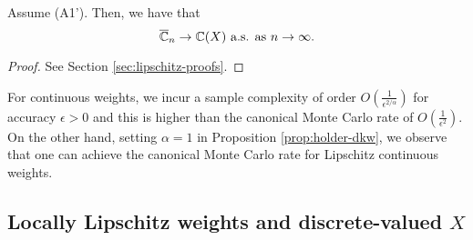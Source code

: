 \begin{proposition}
\label{prop:lipschitz}
Assume (A1'). Then, we have that 
$$\overline {\mathbb{C}}_n
\rightarrow
\mathbb{C}(X)
 \text{   a.s. as } n\rightarrow \infty.
$$
\end{proposition}
\begin{proof}
See Section \ref{sec:lipschitz-proofs}.
\end{proof}

\begin{remark}
 For \holder continuous weights, we incur a sample complexity of order $O\left(\frac1{\epsilon^{2/\alpha}}\right)$ for accuracy $\epsilon>0$ and this is higher than the canonical Monte Carlo rate of $O\left(\frac1{\epsilon^2}\right)$. On the other hand, setting $\alpha=1$ in Proposition \ref{prop:holder-dkw}, we observe that one can achieve the canonical Monte Carlo rate for Lipschitz continuous weights.
\end{remark}

\subsection{Locally Lipschitz weights and discrete-valued $X$}

